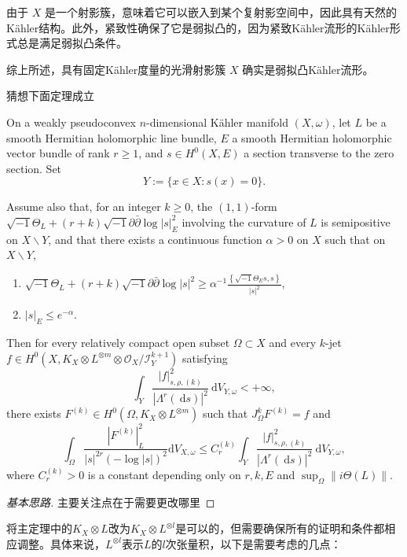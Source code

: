 \documentclass[lang=cn,12pt,fontset=none,a4paper]{beautybook}
\begin{document}
由于 \( X \) 是一个射影簇，意味着它可以嵌入到某个复射影空间中，因此具有天然的Kähler结构。此外，紧致性确保了它是弱拟凸的，因为紧致Kähler流形的Kähler形式总是满足弱拟凸条件。

综上所述，具有固定Kähler度量的光滑射影簇 \( X \) 确实是弱拟凸Kähler流形。

猜想下面定理成立
\begin{theorem}
   On a weakly pseudoconvex $n$-dimensional Kähler manifold $(X, \omega)$, let $L$ be a smooth Hermitian holomorphic line bundle, $E$ a smooth Hermitian holomorphic vector bundle of rank $r \geq 1$, and $s \in H^0(X, E)$ a section transverse to the zero section. Set
   $$
      Y:=\{x \in X: s(x)=0\} .
   $$
   
   Assume also that, for an integer $k \geq 0$, the $(1,1)$-form $\sqrt{-1} \Theta_L+(r+k) \sqrt{-1} \partial \bar{\partial} \log |s|_E^2$ involving the curvature of $L$ is semipositive on $X \backslash Y$, and that there exists a continuous function $\alpha>0$ on $X$ such that on $X \backslash Y$,
   \begin{enumerate}[label=(\roman*)]
      \item $\sqrt{-1} \Theta_L+(r+k) \sqrt{-1} \partial \bar{\partial} \log |s|^2 \geq \alpha^{-1} \frac{\left\{\sqrt{-1} \Theta_E s, s\right\}}{|s|^2}$,
      \item $|s|_E \leq e^{-\alpha}$.
   \end{enumerate}
   Then for every relatively compact open subset $\Omega \subset X$ and every $k$-jet $f \in H^0\left(X, K_X \otimes L^{\otimes m}\otimes \mathscr{O}_X / \mathscr{I}_Y^{k+1}\right)$ satisfying
   $$
      \int_Y \frac{|f|_{s, \rho,(k)}^2}{\left|\Lambda^r(\mathrm{~d} s)\right|^2} \mathrm{~d} V_{Y, \omega}<+\infty,
   $$
   there exists $F^{(k)} \in H^0\left(\Omega, K_X \otimes L^{\otimes m}\right)$ such that $J_{\Omega}^k F^{(k)}=f$ and
   $$
      \int_{\Omega} \frac{\left|F^{(k)}\right|_L^2}{|s|^{2 r} \left(-\log |s|\right)^2} \mathrm{d} V_{X, \omega} \leq C_{r}^{(k)} \int_Y \frac{|f|_{s, \rho,(k)}^2}{\left|\Lambda^r(\mathrm{~d} s)\right|^2} \mathrm{~d} V_{Y, \omega},
   $$
   where $C_{r}^{(k)}>0$ is a constant depending only on $r, k, E$ and $\sup _{\Omega}\|i \Theta(L)\|$.
\end{theorem}
\begin{proof}[基本思路]
   主要关注点在于需要更改哪里
\end{proof}

将主定理中的$K_X\otimes L$改为$K_X\otimes L^{\otimes l}$是可以的，但需要确保所有的证明和条件都相应调整。具体来说，$L^{\otimes l}$表示$L$的$l$次张量积，以下是需要考虑的几点：
\end{document}
